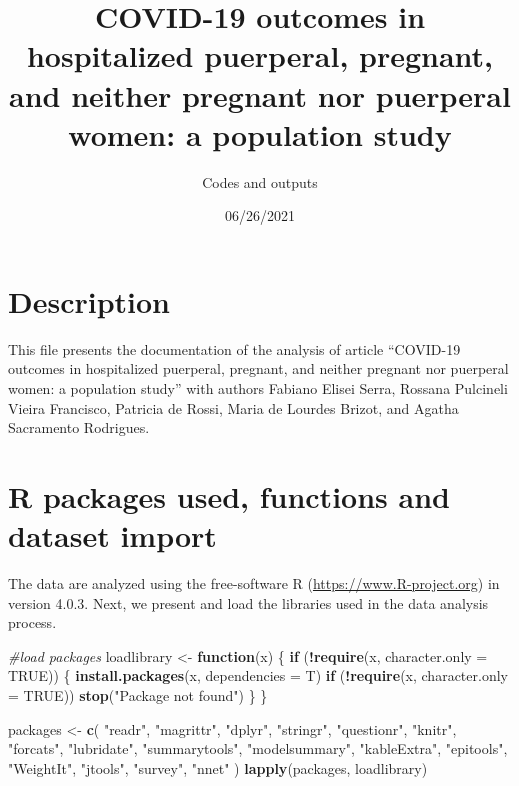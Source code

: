 \documentclass[
]{article}
\title{COVID-19 outcomes in hospitalized puerperal, pregnant, and neither
pregnant nor puerperal women: a population study}
\author{Codes and outputs}
\date{06/26/2021}
\newenvironment{Shaded}{\begin{snugshade}}{\end{snugshade}}
\newcommand{\CommentTok}[1]{\textcolor[rgb]{0.56,0.35,0.01}{\textit{#1}}}
\newcommand{\ControlFlowTok}[1]{\textcolor[rgb]{0.13,0.29,0.53}{\textbf{#1}}}
\newcommand{\DataTypeTok}[1]{\textcolor[rgb]{0.13,0.29,0.53}{#1}}
\newcommand{\KeywordTok}[1]{\textcolor[rgb]{0.13,0.29,0.53}{\textbf{#1}}}
\newcommand{\NormalTok}[1]{#1}
\newcommand{\OperatorTok}[1]{\textcolor[rgb]{0.81,0.36,0.00}{\textbf{#1}}}
\newcommand{\OtherTok}[1]{\textcolor[rgb]{0.56,0.35,0.01}{#1}}
\newcommand{\StringTok}[1]{\textcolor[rgb]{0.31,0.60,0.02}{#1}}
\begin{document}
\maketitle

\hypertarget{description}{%
\section{Description}\label{description}}

This file presents the documentation of the analysis of article
``COVID-19 outcomes in hospitalized puerperal, pregnant, and neither
pregnant nor puerperal women: a population study'' with authors Fabiano
Elisei Serra, Rossana Pulcineli Vieira Francisco, Patricia de Rossi,
Maria de Lourdes Brizot, and Agatha Sacramento Rodrigues.

\hypertarget{r-packages-used-functions-and-dataset-import}{%
\section{R packages used, functions and dataset
import}\label{r-packages-used-functions-and-dataset-import}}

The data are analyzed using the free-software R
(\url{https://www.R-project.org}) in version 4.0.3. Next, we present and
load the libraries used in the data analysis process.

\begin{Shaded}
\begin{Highlighting}[]
\CommentTok{#load packages}
\NormalTok{loadlibrary <-}\StringTok{ }\ControlFlowTok{function}\NormalTok{(x) \{}
  \ControlFlowTok{if}\NormalTok{ (}\OperatorTok{!}\KeywordTok{require}\NormalTok{(x, }\DataTypeTok{character.only =} \OtherTok{TRUE}\NormalTok{)) \{}
    \KeywordTok{install.packages}\NormalTok{(x, }\DataTypeTok{dependencies =}\NormalTok{ T)}
    \ControlFlowTok{if}\NormalTok{ (}\OperatorTok{!}\KeywordTok{require}\NormalTok{(x, }\DataTypeTok{character.only =} \OtherTok{TRUE}\NormalTok{))}
      \KeywordTok{stop}\NormalTok{(}\StringTok{"Package not found"}\NormalTok{)}
\NormalTok{  \}}
\NormalTok{\}}

\NormalTok{packages <-}
\StringTok{  }\KeywordTok{c}\NormalTok{(}
    \StringTok{"readr"}\NormalTok{,}
    \StringTok{"magrittr"}\NormalTok{,}
    \StringTok{"dplyr"}\NormalTok{,}
    \StringTok{"stringr"}\NormalTok{,}
    \StringTok{"questionr"}\NormalTok{,}
    \StringTok{"knitr"}\NormalTok{,}
    \StringTok{"forcats"}\NormalTok{,}
    \StringTok{"lubridate"}\NormalTok{,}
    \StringTok{"summarytools"}\NormalTok{,}
    \StringTok{"modelsummary"}\NormalTok{,}
    \StringTok{"kableExtra"}\NormalTok{,}
    \StringTok{"epitools"}\NormalTok{,}
    \StringTok{"WeightIt"}\NormalTok{,}
    \StringTok{"jtools"}\NormalTok{,}
    \StringTok{"survey"}\NormalTok{,}
    \StringTok{"nnet"}
\NormalTok{  )}
\KeywordTok{lapply}\NormalTok{(packages, loadlibrary)}
\end{Highlighting}
\end{Shaded}
\end{document}
